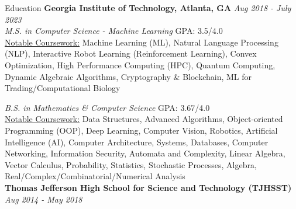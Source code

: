 \documentclass{template} %
\begin{document}

\begin{rSection}{Education}
{\bf Georgia Institute of Technology, Atlanta, GA} \hfill {\em Aug 2018 - July 2023}
\\ {\em M.S. in Computer Science - Machine Learning} \hfill  GPA: 3.5/4.0
\vspace{0.1cm}
\\ \underline{Notable Coursework:} Machine Learning (ML), Natural Language Processing (NLP), Interactive Robot Learning (Reinforcement Learning), Convex Optimization, High Performance Computing (HPC), Quantum Computing, Dynamic Algebraic Algorithms, Cryptography \& Blockchain, ML for Trading/Computational Biology 

{\em B.S. in Mathematics \& Computer Science} \hfill  GPA: 3.67/4.0
\vspace{0.1cm}
\\ \underline{Notable Coursework:} Data Structures, Advanced Algorithms, Object-oriented Programming (OOP), Deep Learning, Computer Vision, Robotics, Artificial Intelligence (AI), Computer Architecture, Systems, Databases, Computer Networking, Information Security, Automata and Complexity, Linear Algebra, Vector Calculus, Probability, Statistics, Stochastic Processes, Algebra, Real/Complex/Combinatorial/Numerical Analysis
\vspace{0.20cm}
\\ {\bf Thomas Jefferson High School for Science and Technology (TJHSST)} \hfill {\em Aug 2014 - May 2018}
\end{rSection}

\end{document}
